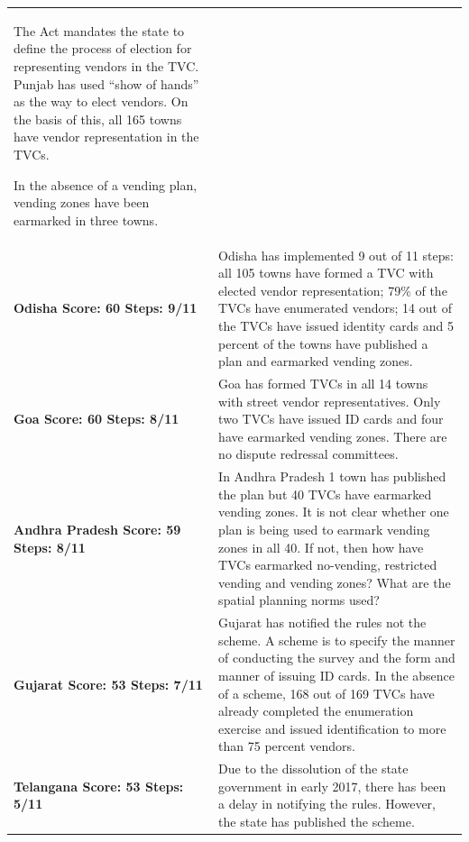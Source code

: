 \documentclass[a4paper, 12pt, twoside]{article}
\begin{document}
{\begin{longtable}[l]{>{\raggedright}p{4cm}>{\raggedright\arraybackslash}p{10cm}}
The Act mandates the state to define the process of election for representing vendors in the TVC. Punjab has used “show of hands” as the way to elect vendors. On the basis of  this, all 165 towns have vendor representation in the TVCs.


In the absence of a vending plan, vending zones have been earmarked in three towns.
\\
\cellcolor{SVACgreen3}\bf{Odisha}
\newline
\bf{Score: 60}
\newline
\bf{Steps: 9/11}
&
\cellcolor{SVACgreen2}Odisha has implemented 9 out of 11 steps: all 105 towns have formed a TVC with elected vendor representation; 79\% of the TVCs have enumerated vendors; 14 out of the TVCs have issued identity cards and 5 percent of the towns have published a plan and earmarked vending zones.
\\
\cellcolor{SVACgreen3}\bf{Goa}
\newline
\bf{Score: 60}
\newline
\bf{Steps: 8/11}
&
\cellcolor{SVACgreen2}Goa has formed TVCs in all 14 towns with street vendor representatives. Only two TVCs have issued ID cards and four have earmarked vending zones. There are no dispute redressal committees.
\\
\cellcolor{SVACgreen3}\bf{Andhra Pradesh}
\newline
\bf{Score: 59}
\newline
\bf{Steps: 8/11}
&
\cellcolor{SVACgreen2}In Andhra Pradesh 1 town has published the plan but 40 TVCs have earmarked vending zones. It is not clear whether one plan is being used to earmark vending zones in all 40. If not, then how have TVCs earmarked no-vending, restricted vending and vending zones? What are the spatial planning norms used?
\\
\cellcolor{SVACgreen3}\bf{Gujarat}
\newline
\bf{Score: 53}
\newline
\bf{Steps: 7/11}
&
\cellcolor{SVACgreen2}Gujarat has notified the rules not the scheme. A scheme is to specify the manner of conducting the survey and the form and manner of issuing ID cards. In the absence of a scheme, 168 out of 169 TVCs have already completed the enumeration exercise and issued identification to more than 75 percent vendors.
\\
\cellcolor{SVACgreen3}\bf{Telangana}
\newline
\bf{Score: 53}
\newline
\bf{Steps: 5/11}
&
\cellcolor{SVACgreen2}Due to the dissolution of the state government in early 2017, there has been a delay in notifying the rules. However, the state has published the scheme.


\end{longtable}}
\end{document}
